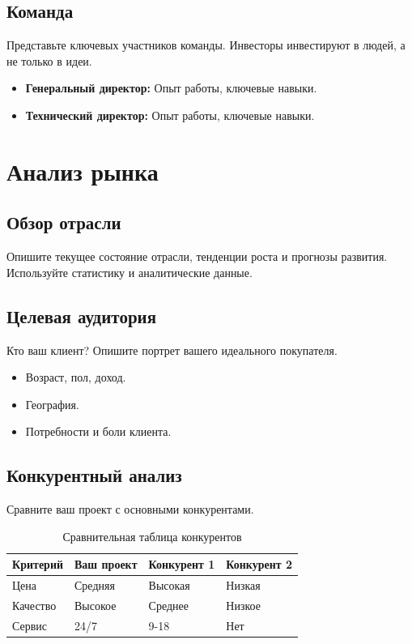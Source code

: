 \documentclass[a4paper,12pt]{article}
\begin{document}
\subsection{Команда}
Представьте ключевых участников команды. Инвесторы инвестируют в людей, а не только в идеи.

\begin{itemize}
    \item \textbf{Генеральный директор:} Опыт работы, ключевые навыки.
    \item \textbf{Технический директор:} Опыт работы, ключевые навыки.
\end{itemize}

\newpage
\section{Анализ рынка}

\subsection{Обзор отрасли}
Опишите текущее состояние отрасли, тенденции роста и прогнозы развития. Используйте статистику и аналитические данные.

\subsection{Целевая аудитория}
Кто ваш клиент? Опишите портрет вашего идеального покупателя.
\begin{itemize}
    \item Возраст, пол, доход.
    \item География.
    \item Потребности и боли клиента.
\end{itemize}

\subsection{Конкурентный анализ}
Сравните ваш проект с основными конкурентами.

\begin{table}[h!]
\centering
\renewcommand{\arraystretch}{1.5}
\begin{tabular}{|p{3cm}|p{3cm}|p{3cm}|p{3cm}|}
\hline
\textbf{Критерий} & \textbf{Ваш проект} & \textbf{Конкурент 1} & \textbf{Конкурент 2} \\ \hline
Цена & Средняя & Высокая & Низкая \\ \hline
Качество & Высокое & Среднее & Низкое \\ \hline
Сервис & 24/7 & 9-18 & Нет \\ \hline
\end{tabular}
\caption{Сравнительная таблица конкурентов}
\end{table}
\end{document}
